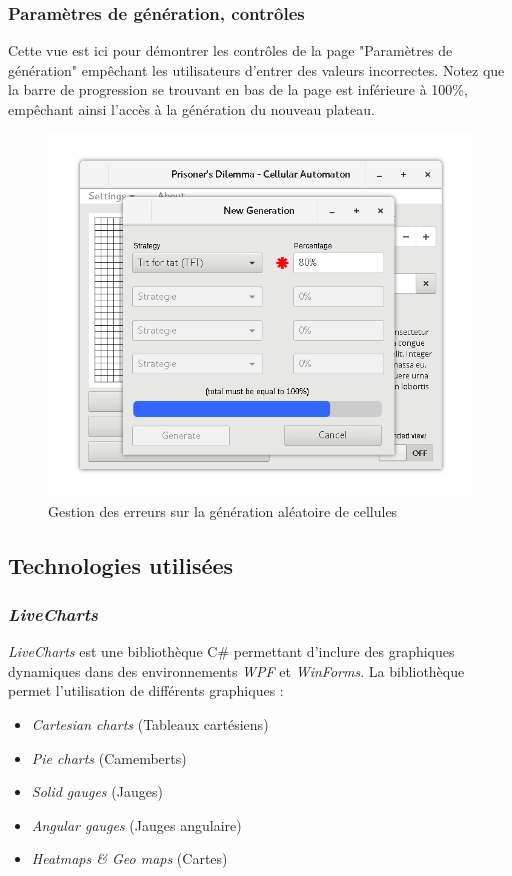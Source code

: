 \documentclass[a4paper]{article}
\begin{document}
\pagebreak
\subsubsection{Paramètres de génération, contrôles}
Cette vue est ici pour démontrer les contrôles de la page "Paramètres de génération" empêchant les utilisateurs d'entrer des valeurs incorrectes. Notez que la barre de progression se trouvant en bas de la page est inférieure à 100\%, empêchant ainsi l'accès à la génération du nouveau plateau.

\vfill
\begin{figure}[htp]
    \centering
    \includegraphics[width=12cm]{interface/generationsettingsinvalid.png}
    \caption{Gestion des erreurs sur la génération aléatoire de cellules}
\end{figure}
\vfill
\pagebreak

\subsection{Technologies utilisées}
\subsubsection{\textit{LiveCharts}}
\textit{LiveCharts} est une bibliothèque C\# permettant d'inclure des graphiques dynamiques dans des environnements \textit{WPF} et \textit{WinForms}. La bibliothèque permet l'utilisation de différents graphiques :

\begin{itemize}
    \item \textit{Cartesian charts} (Tableaux cartésiens)
    \item \textit{Pie charts} (Camemberts)
    \item \textit{Solid gauges} (Jauges)
    \item \textit{Angular gauges} (Jauges angulaire)
    \item \textit{Heatmaps \& Geo maps} (Cartes)
\end{itemize}
\end{document}
